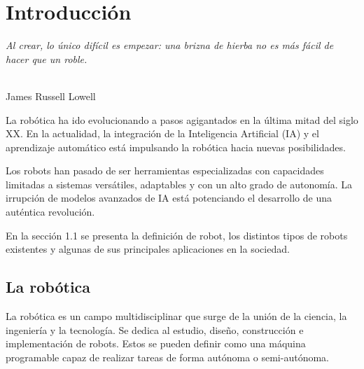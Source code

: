 \chapter{Introducción}
\label{cap:capitulo1}
\setcounter{page}{1}

\begin{flushright}
\begin{minipage}[]{10cm}
\emph{Al crear, lo único difícil es empezar: una brizna de hierba no es más fácil de hacer que un roble.}\\
\end{minipage}\\

James Russell Lowell\\
\end{flushright}

\vspace{1cm}


La robótica ha ido evolucionando a pasos agigantados en la última mitad del siglo XX.
En la actualidad, la integración de la Inteligencia Artificial (IA) y el aprendizaje automático está impulsando la robótica hacia nuevas posibilidades.  

\vspace{0.5cm}

Los robots han pasado de ser herramientas especializadas con capacidades limitadas a sistemas versátiles, adaptables y con un alto grado de autonomía.
La irrupción de modelos avanzados de IA está potenciando el desarrollo de una auténtica revolución.

\vspace{0.5cm}

En la sección 1.1 se presenta la definición de robot,  los distintos tipos de robots existentes y algunas de sus principales aplicaciones en la sociedad.\\

\section{La robótica}
\label{sec:La robótica} %

La robótica es un campo multidisciplinar que surge de la unión de la ciencia, la ingeniería y la tecnología. Se dedica al estudio, diseño, construcción e implementación de robots. Estos se pueden definir como una máquina programable capaz de realizar tareas de forma autónoma o semi-autónoma.

\vspace{0.5cm}

